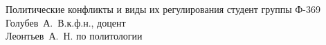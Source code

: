 


\usepackage{color}
\usepackage[colorlinks,linkcolor=black,filecolor=blue,citecolor=blue]{hyperref}


    {Политические конфликты и виды их регулирования}
    {студент группы Ф-369\\Голубев~А.~В.}{к.ф.н., доцент\\Леонтьев~А.~Н.}
    {по политологии}
        
    \tableofcontents
    \thispagestyle{empty}
    \newpage
    

